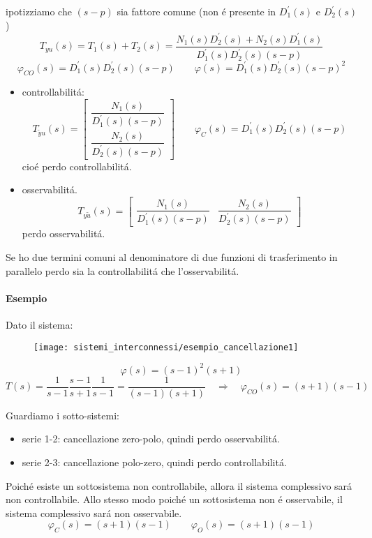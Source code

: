 \documentclass[../main.tex]{subfiles}
\begin{document}
\begin{itemize}
				ipotizziamo che $ (s-p) $ sia fattore comune (non \'e presente in $ D_1^{'}(s) $ e $ D_2^{'}(s) $)
				\[
					T_{yu}(s) = T_1(s) + T_2(s) = 
					\dfrac{N_1(s)D_2^{'}(s) + N_2(s)D_1^{'}(s)}{D_1^{'}(s) D_2^{'}(s) (s-p)}
				\]
				\[
					\varphi_{CO}(s) = D_1^{'}(s) D_2^{'}(s) (s-p) \qquad \varphi(s) = D_1^{'}(s) D_2^{'}(s) (s-p)^2
				\]
				\begin{itemize}
					\item 
						controllabilit\'a:
						\[
							T_{\tilde y u}(s) =
							\begin{bmatrix}
								\dfrac{N_1(s)}{D_1^{'}(s) (s-p)}\\
								\dfrac{N_2(s)}{D_2^{'}(s) (s-p)}
							\end{bmatrix}
							\qquad
							\varphi_C(s) = D_1^{'}(s) D_2^{'}(s) (s-p)
						\]
						cio\'e perdo controllabilit\'a.
					\item 
						osservabilit\'a.
						\[
							T_{y \tilde u}(s) = 
							\begin{bmatrix}
								\dfrac{N_1(s)}{D_1^{'}(s) (s-p)} &
								\dfrac{N_2(s)}{D_2^{'}(s) (s-p)}
							\end{bmatrix}
						\]
						perdo osservabilit\'a.
				\end{itemize}
			Se ho due termini comuni al denominatore di due funzioni di trasferimento in parallelo perdo sia la controllabilit\'a che l'osservabilit\'a.
		\end{itemize}
	
		\begin{mdframed}[style=Esempio]
			\paragraph{Esempio}
				Dato il sistema:
				\begin{figure}[H]
					\centering\texttt{[image: sistemi\_interconnessi/esempio\_cancellazione1]}
				\end{figure}
				\[
					\varphi(s) = (s-1)^2 (s+1)
				\]
				\[
					T(s) = \dfrac{1}{s-1} \dfrac{s-1}{s+1} \dfrac{1}{s-1} = \dfrac{1}{(s-1)(s+1)} \quad\Rightarrow\quad \varphi_{CO}(s) = (s+1)(s-1)
				\]
				
				Guardiamo i sotto-sistemi:
				\begin{itemize}
					\item 
						serie 1-2: cancellazione zero-polo, quindi perdo osservabilit\'a.
					\item 
						serie 2-3: cancellazione polo-zero, quindi perdo controllabilit\'a.
				\end{itemize}
				
				Poich\'e esiste un sottosistema non controllabile, allora il sistema complessivo sar\'a non controllabile. Allo stesso modo poich\'e un sottosistema non \'e osservabile, il sistema complessivo sar\'a non osservabile.
				\[
					\varphi_C(s) = (s+1)(s-1) \qquad \varphi_O(s) = (s+1)(s-1)
				\]
		\end{mdframed}
	
\end{document}
